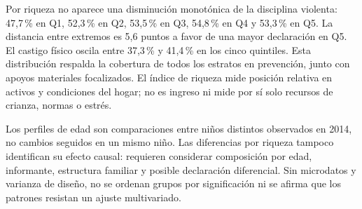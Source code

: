 Por riqueza no aparece una disminución monotónica de la disciplina violenta:
47,7\,\% en Q1, 52,3\,\% en Q2, 53,5\,\% en Q3, 54,8\,\% en Q4 y 53,3\,\%
en Q5. La distancia entre extremos es 5,6 puntos a favor de una mayor
declaración en Q5. El castigo físico oscila entre 37,3\,\% y 41,4\,\% en los
cinco quintiles. Esta distribución respalda la cobertura de todos los
estratos en prevención, junto con apoyos materiales focalizados. El índice
de riqueza mide posición relativa en activos y condiciones del hogar; no
es ingreso ni mide por sí solo recursos de crianza, normas o estrés.

Los perfiles de edad son comparaciones entre niños distintos observados en
2014, no cambios seguidos en un mismo niño. Las diferencias por riqueza
tampoco identifican su efecto causal: requieren considerar composición por
edad, informante, estructura familiar y posible declaración diferencial.
Sin microdatos y varianza de diseño, no se ordenan grupos por significación
ni se afirma que los patrones resistan un ajuste multivariado.
